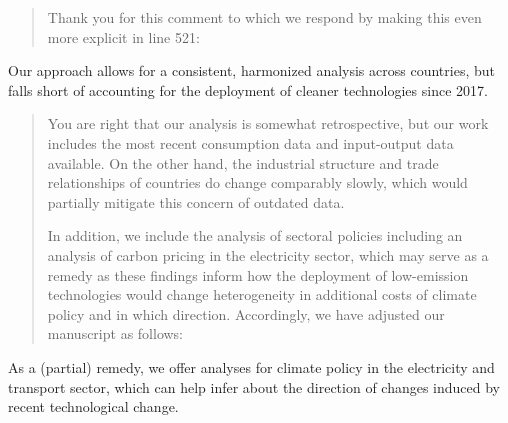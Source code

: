\documentclass[11pt]{article}
\newenvironment{response}
{\begin{quote}\color{black}}
{\end{quote}}
\begin{document}
\begin{response}
    Thank you for this comment to which we respond by making this even more explicit in line 521:
\end{response}

\begin{revisionbox}
    Our approach allows for a consistent, harmonized analysis across countries, but falls short of accounting for the deployment of cleaner technologies since 2017.
\end{revisionbox}

\begin{response}
  You are right that our analysis is somewhat retrospective, but our work includes the most recent consumption data and input-output data available. On the other hand, the industrial structure and trade relationships of countries do change comparably slowly, which would partially mitigate this concern of outdated data.

  In addition, we include the analysis of sectoral policies including an analysis of carbon pricing in the electricity sector, which may serve as a remedy as these findings inform how the deployment of low-emission technologies would change heterogeneity in additional costs of climate policy and in which direction. Accordingly, we have adjusted our manuscript as follows:

\end{response}

\begin{revisionbox}
    As a (partial) remedy, we offer analyses for climate policy in the electricity and transport sector, which can help infer about the direction of changes induced by recent technological change.
\end{revisionbox}
\end{document}
